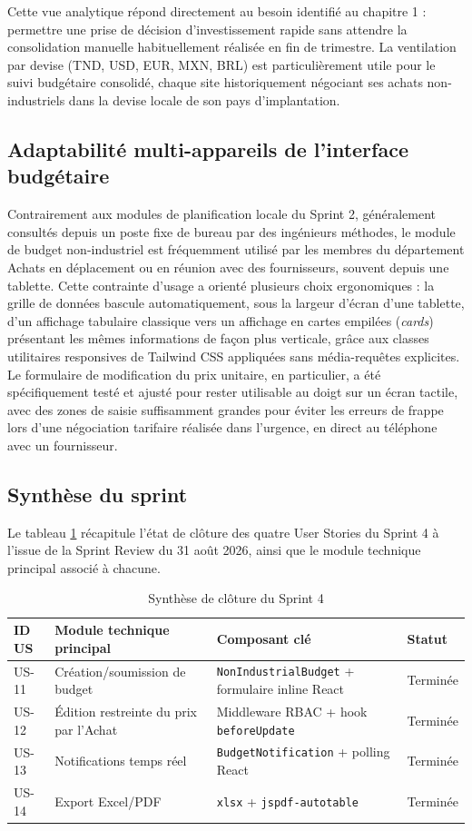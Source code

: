 Cette vue analytique répond directement au besoin identifié au chapitre 1 : permettre une prise de décision d'investissement rapide sans attendre la consolidation manuelle habituellement réalisée en fin de trimestre. La ventilation par devise (TND, USD, EUR, MXN, BRL) est particulièrement utile pour le suivi budgétaire consolidé, chaque site historiquement négociant ses achats non-industriels dans la devise locale de son pays d'implantation.

\subsection{Adaptabilité multi-appareils de l'interface budgétaire}
Contrairement aux modules de planification locale du Sprint 2, généralement consultés depuis un poste fixe de bureau par des ingénieurs méthodes, le module de budget non-industriel est fréquemment utilisé par les membres du département Achats en déplacement ou en réunion avec des fournisseurs, souvent depuis une tablette. Cette contrainte d'usage a orienté plusieurs choix ergonomiques : la grille de données bascule automatiquement, sous la largeur d'écran d'une tablette, d'un affichage tabulaire classique vers un affichage en cartes empilées (\textit{cards}) présentant les mêmes informations de façon plus verticale, grâce aux classes utilitaires responsives de Tailwind CSS appliquées sans média-requêtes explicites. Le formulaire de modification du prix unitaire, en particulier, a été spécifiquement testé et ajusté pour rester utilisable au doigt sur un écran tactile, avec des zones de saisie suffisamment grandes pour éviter les erreurs de frappe lors d'une négociation tarifaire réalisée dans l'urgence, en direct au téléphone avec un fournisseur.

\subsection{Synthèse du sprint}
Le tableau \ref{tab:synthese_sprint4} récapitule l'état de clôture des quatre User Stories du Sprint 4 à l'issue de la Sprint Review du 31 août 2026, ainsi que le module technique principal associé à chacune.

\begin{table}[h]
\centering
\begin{tabular}{|p{1.6cm}|p{6.5cm}|p{4cm}|p{2cm}|}
\hline
\textbf{ID US} & \textbf{Module technique principal} & \textbf{Composant clé} & \textbf{Statut} \\ \hline
US-11 & Création/soumission de budget & \texttt{NonIndustrialBudget} + formulaire inline React & Terminée \\ \hline
US-12 & Édition restreinte du prix par l'Achat & Middleware RBAC + hook \texttt{beforeUpdate} & Terminée \\ \hline
US-13 & Notifications temps réel & \texttt{BudgetNotification} + polling React & Terminée \\ \hline
US-14 & Export Excel/PDF & \texttt{xlsx} + \texttt{jspdf-autotable} & Terminée \\ \hline
\end{tabular}
\caption{Synthèse de clôture du Sprint 4}
\label{tab:synthese_sprint4}
\end{table}

